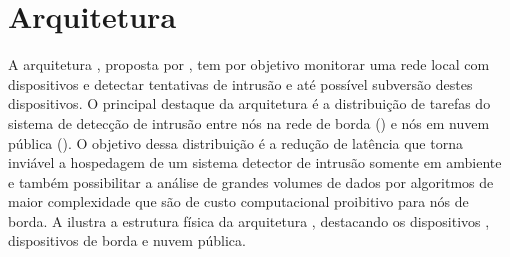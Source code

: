 

\section{Arquitetura \idsiot}\label{sec:cassales}

A arquitetura \idsiot, proposta por , tem por objetivo
monitorar uma rede local com dispositivos \iot e detectar tentativas de intrusão
e até possível subversão destes dispositivos.
O principal destaque da arquitetura é a distribuição de tarefas do sistema de
detecção de intrusão entre nós na rede de borda (\fog) e nós em nuvem pública
(\cloud).
O objetivo dessa distribuição é a redução de latência que torna inviável a
hospedagem de um sistema detector de intrusão somente em ambiente \cloud e
também possibilitar a análise de grandes volumes de dados por algoritmos de
maior complexidade que são de custo computacional proibitivo para nós de borda.
A  ilustra a estrutura física da arquitetura \idsiot,
destacando os dispositivos \iot, dispositivos de borda e nuvem pública.

